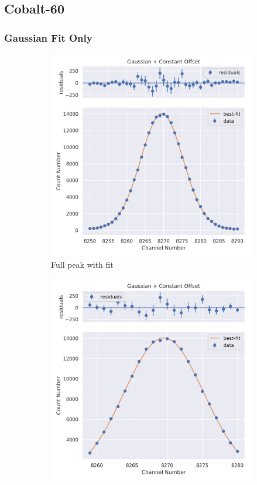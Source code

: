 \documentclass[11pt,a4paper]{article}
\begin{document}
\subsection{Cobalt-60}
\subsubsection{Gaussian Fit Only}
\begin{figure}[H]
  \centering
  \begin{subfigure}{.5\linewidth}
    \centering
    \includegraphics[width=\linewidth]{./Images/Cobalt60/Gauss/Gauss_1_Full.png}
    \caption{Full peak with fit}
  \end{subfigure}%
  \begin{subfigure}{.5\linewidth}
    \centering
    \includegraphics[width=\linewidth]{./Images/Cobalt60/Gauss/Gauss_1_Zoom.png}

\end{subfigure}
\end{figure}
\end{document}
